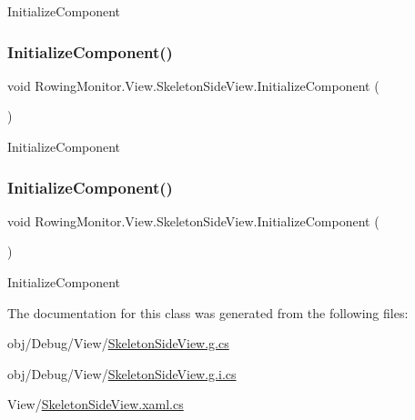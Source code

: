 Initialize\+Component 

\mbox{\label{class_rowing_monitor_1_1_view_1_1_skeleton_side_view_ae823832e7aa40c2585f66c0939c83040}} 
\subsubsection{\texorpdfstring{Initialize\+Component()}{InitializeComponent()}\hspace{0.1cm}{\footnotesize\ttfamily [3/4]}}
{\footnotesize\ttfamily void Rowing\+Monitor.\+View.\+Skeleton\+Side\+View.\+Initialize\+Component (\begin{DoxyParamCaption}{ }\end{DoxyParamCaption})}



Initialize\+Component 

\mbox{\label{class_rowing_monitor_1_1_view_1_1_skeleton_side_view_ae823832e7aa40c2585f66c0939c83040}} 
\subsubsection{\texorpdfstring{Initialize\+Component()}{InitializeComponent()}\hspace{0.1cm}{\footnotesize\ttfamily [4/4]}}
{\footnotesize\ttfamily void Rowing\+Monitor.\+View.\+Skeleton\+Side\+View.\+Initialize\+Component (\begin{DoxyParamCaption}{ }\end{DoxyParamCaption})}



Initialize\+Component 



The documentation for this class was generated from the following files\+:\begin{DoxyCompactItemize}
\item 
obj/\+Debug/\+View/\hyperlink{_debug_2_view_2_skeleton_side_view_8g_8cs}{Skeleton\+Side\+View.\+g.\+cs}\item 
obj/\+Debug/\+View/\hyperlink{_debug_2_view_2_skeleton_side_view_8g_8i_8cs}{Skeleton\+Side\+View.\+g.\+i.\+cs}\item 
View/\hyperlink{_skeleton_side_view_8xaml_8cs}{Skeleton\+Side\+View.\+xaml.\+cs}\end{DoxyCompactItemize}
